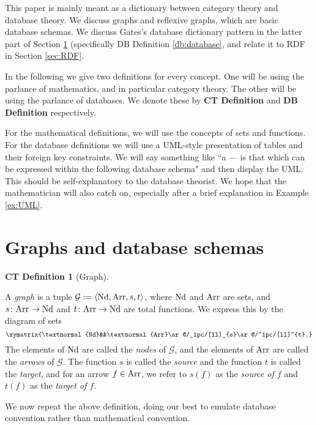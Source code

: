 \documentclass{amsart}
\def\tn{\textnormal}
\def\mc{\mathcal}
\def\Hom{\tn{Arr}}
\def\Ob{\tn{Nd}}
\def\to{\rightarrow}
\def\taking{\colon}
\def\la{\langle}
\def\ra{\rangle}
\def\mcG{\mc{G}}
\theoremstyle{remark}
\theoremstyle{definition}
\newtheorem{ctdef}{CT Definition}
\begin{document}
This paper is mainly meant as a dictionary between category theory and database theory.  We discuss graphs and reflexive graphs, which are basic database schemas.   We discuss Gates's database dictionary pattern in the latter part of Section \ref{sec:graphs and dbs} (specifically DB Definition \ref{db:database}, and relate it to RDF in Section \ref{sec:RDF}.

In the following we give two definitions for every concept.  One will be using the parlance of mathematics, and in particular category theory.  The other will be using the parlance of databases.  We denote these by {\bf CT Definition} and {\bf DB Definition} respectively.  

For the mathematical definitions, we will use the concepts of sets and functions.  For the database definitions we will use a UML-style presentation of tables and their foreign key constraints.  We will say something like ``a --- is that which can be expressed within the following database schema" and then display the UML.  This should be self-explanatory to the database theorist.  We hope that the mathematician will also catch on, especially after a brief explanation in Example \ref{ex:UML}.

\section{Graphs and database schemas}\label{sec:graphs and dbs}

\begin{ctdef}[Graph]\label{ct:graph}

A {\em graph} is a tuple $\mcG:=\la\Ob,\Hom,s,t\ra$, where $\Ob$ and $\Hom$ are sets, and $s\taking\Hom\to\Ob$ and $t\taking\Hom\to\Ob$ are total functions.  We express this by the diagram of sets $$\xymatrix{\Ob&&\Hom\ar@/_1pc/[ll]_{s}\ar@/^1pc/[ll]^{t}.}$$  The elements of $\Ob$ are called the {\em nodes} of $\mcG$, and the elements of $\Hom$ are called the {\em arrows} of $\mcG$.  The function $s$ is called the {\em source} and the function $t$ is called the {\em target}, and for an arrow $f\in\Hom$, we refer to $s(f)$ as the {\em source of $f$} and $t(f)$ as the {\em target of $f$}.

\end{ctdef}

We now repeat the above definition, doing our best to emulate database convention rather than mathematical convention.  
\end{document}
